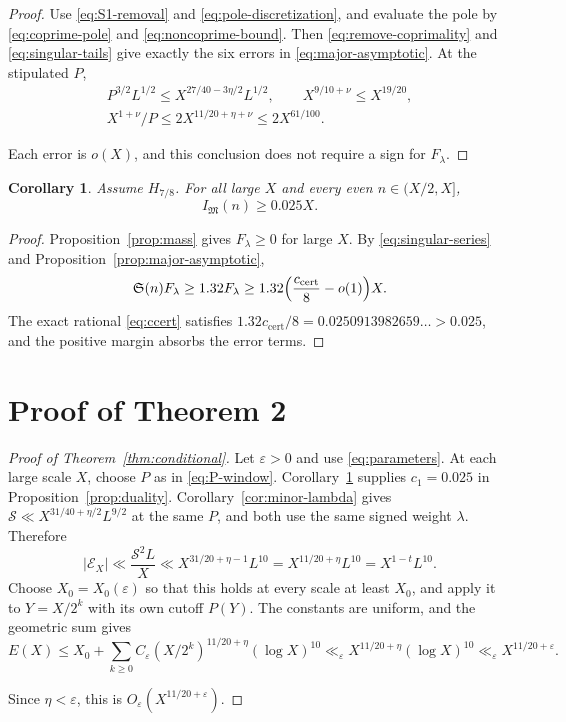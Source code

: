 \documentclass{amsart}
\newtheorem{corollary}[lemma]{Corollary}
\numberwithin{equation}{section}
\numberwithin{table}{section}
\newcommand{\M}{\mathfrak M}
\newcommand{\ccert}{c_{\mathrm{cert}}}
\begin{document}
\begin{proof}
Use \eqref{eq:S1-removal} and \eqref{eq:pole-discretization}, and
evaluate the pole by \eqref{eq:coprime-pole} and
\eqref{eq:noncoprime-bound}. Then \eqref{eq:remove-coprimality} and
\eqref{eq:singular-tails} give exactly the six errors in
\eqref{eq:major-asymptotic}. At the stipulated $P$,
\begin{gather*}
P^{3/2}L^{1/2}\le X^{27/40-3\eta/2}L^{1/2},\qquad
X^{9/10+\nu}\le X^{19/20},\\
X^{1+\nu}/P\le2X^{11/20+\eta+\nu}\le2X^{61/100}.
\end{gather*}

Each error is $o(X)$, and this conclusion does not require a sign for
$F_\lambda$.
\end{proof}

\begin{corollary}\label{cor:major-positive}
Assume $H_{7/8}$. For all large $X$ and every even $n\in(X/2,X]$,
\[
I_\M(n)\ge0.025X.
\]
\end{corollary}

\begin{proof}
Proposition~\ref{prop:mass} gives $F_\lambda\ge0$ for large $X$.
By \eqref{eq:singular-series} and Proposition~\ref{prop:major-asymptotic},
\[
\mathfrak S(n)F_\lambda
\ge1.32F_\lambda
\ge1.32\Bigl(\frac{\ccert}{8}-o(1)\Bigr)X.
\]
The exact rational \eqref{eq:ccert} satisfies
$1.32\ccert/8=0.0250913982659\ldots>0.025$, and the positive margin
absorbs the error terms.
\end{proof}

\section{Proof of Theorem 2}\label{sec:proof-conditional}

\begin{proof}[Proof of Theorem~\ref{thm:conditional}]
Let $\varepsilon>0$ and use \eqref{eq:parameters}. At each large scale
$X$, choose $P$ as in \eqref{eq:P-window}. Corollary~\ref{cor:major-positive} supplies $c_1=0.025$ in
Proposition~\ref{prop:duality}.
Corollary~\ref{cor:minor-lambda} gives
$\mathcal S\ll X^{31/40+\eta/2}L^{9/2}$ at the same $P$, and both use the
same signed weight $\lambda$. Therefore
\[
|\mathcal E_X|
\ll\frac{\mathcal S^2L}{X}
\ll X^{31/20+\eta-1}L^{10}
=X^{11/20+\eta}L^{10}=X^{1-t}L^{10}.
\]
Choose $X_0=X_0(\varepsilon)$ so that this holds at every scale at least
$X_0$, and apply it to $Y=X/2^k$ with its own cutoff $P(Y)$.
The constants are uniform, and the geometric sum gives
\[
E(X)\le X_0+
\sum_{k\ge0}C_\varepsilon(X/2^k)^{11/20+\eta}(\log X)^{10}
\ll_\varepsilon X^{11/20+\eta}(\log X)^{10}
\ll_\varepsilon X^{11/20+\varepsilon}.
\]

Since $\eta<\varepsilon$, this is $O_\varepsilon(X^{11/20+\varepsilon})$.
\end{proof}
\end{document}
